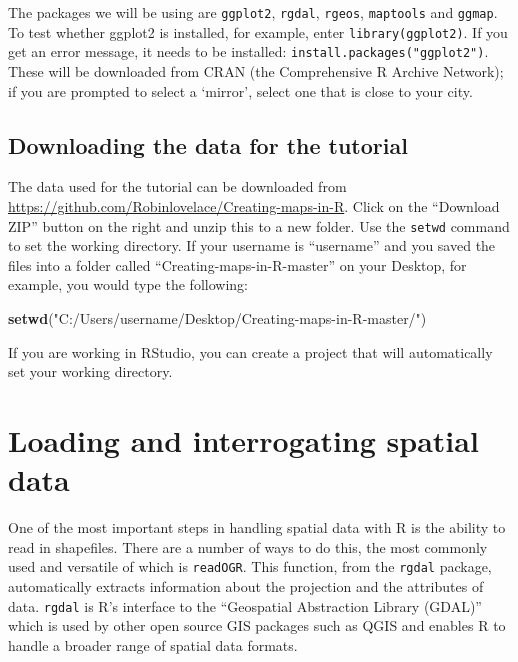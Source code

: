 \documentclass[]{article}
\newenvironment{Shaded}{}{}
\newcommand{\KeywordTok}[1]{\textcolor[rgb]{0.00,0.44,0.13}{\textbf{{#1}}}}
\newcommand{\StringTok}[1]{\textcolor[rgb]{0.25,0.44,0.63}{{#1}}}
\newcommand{\NormalTok}[1]{{#1}}
\begin{document}
The packages we will be using are \texttt{ggplot2}, \texttt{rgdal},
\texttt{rgeos}, \texttt{maptools} and \texttt{ggmap}. To test whether
ggplot2 is installed, for example, enter \texttt{library(ggplot2)}. If
you get an error message, it needs to be installed:
\texttt{install.packages("ggplot2")}. These will be downloaded from CRAN
(the Comprehensive R Archive Network); if you are prompted to select a
`mirror', select one that is close to your city.

\subsection{Downloading the data for the tutorial}

The data used for the tutorial can be downloaded from
\href{https://github.com/Robinlovelace/Creating-maps-in-R}{https://github.com/Robinlovelace/Creating-maps-in-R}.
Click on the ``Download ZIP'' button on the right and unzip this to a
new folder. Use the \texttt{setwd} command to set the working directory.
If your username is ``username'' and you saved the files into a folder
called ``Creating-maps-in-R-master'' on your Desktop, for example, you
would type the following:

\begin{Shaded}
\begin{Highlighting}[]
\KeywordTok{setwd}\NormalTok{(}\StringTok{"C:/Users/username/Desktop/Creating-maps-in-R-master/"}\NormalTok{)}
\end{Highlighting}
\end{Shaded}
If you are working in RStudio, you can create a project that will
automatically set your working directory.

\section{Loading and interrogating spatial data}

One of the most important steps in handling spatial data with R is the
ability to read in shapefiles. There are a number of ways to do this,
the most commonly used and versatile of which is \texttt{readOGR}. This
function, from the \texttt{rgdal} package, automatically extracts
information about the projection and the attributes of data.
\texttt{rgdal} is R's interface to the ``Geospatial Abstraction Library
(GDAL)'' which is used by other open source GIS packages such as QGIS
and enables R to handle a broader range of spatial data formats.
\end{document}
